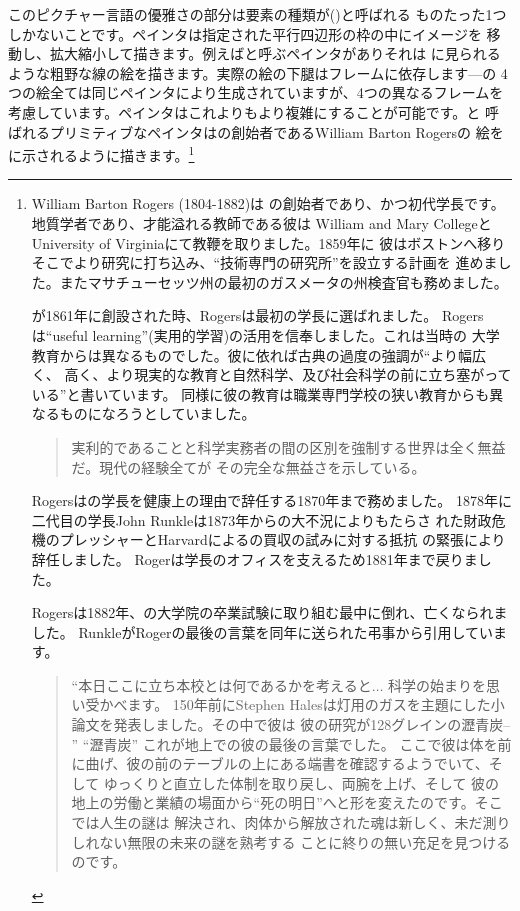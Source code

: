 \noindent
このピクチャー言語の優雅さの部分は要素の種類が()と呼ばれる
ものたった1つしかないことです。ペインタは指定された平行四辺形の枠の中にイメージを
移動し、拡大縮小して描きます。例えばと呼ぶペインタがありそれは
に見られるような粗野な線の絵を描きます。実際の絵の下腿はフレームに依存します---の
4つの絵全ては同じペインタにより生成されていますが、4つの異なるフレームを
考慮しています。ペインタはこれよりもより複雑にすることが可能です。と
呼ばれるプリミティブなペインタはの創始者であるWilliam Barton Rogersの
絵をに示されるように描きます。\footnote{
William Barton Rogers (1804-1882)は
の創始者であり、かつ初代学長です。地質学者であり、才能溢れる教師である彼は
William and Mary CollegeとUniversity of Virginiaにて教鞭を取りました。1859年に
彼はボストンへ移りそこでより研究に打ち込み、``技術専門の研究所''を設立する計画を
進めました。またマサチューセッツ州の最初のガスメータの州検査官も務めました。




が1861年に創設された時、Rogersは最初の学長に選ばれました。
Rogersは``useful learning''(実用的学習)の活用を信奉しました。これは当時の
大学教育からは異なるものでした。彼に依れば古典の過度の強調が``より幅広く、
高く、より現実的な教育と自然科学、及び社会科学の前に立ち塞がっている''と書いています。
同様に彼の教育は職業専門学校の狭い教育からも異なるものになろうとしていました。

\begin{quote}
実利的であることと科学実務者の間の区別を強制する世界は全く無益だ。現代の経験全てが
その完全な無益さを示している。
\end{quote}



Rogersはの学長を健康上の理由で辞任する1870年まで務めました。
1878年に二代目の学長John Runkleは1873年からの大不況によりもたらさ
れた財政危機のプレッシャーとHarvardによるの買収の試みに対する抵抗
の緊張により辞任しました。
Rogerは学長のオフィスを支えるため1881年まで戻りました。



Rogersは1882年、の大学院の卒業試験に取り組む最中に倒れ、亡くなられました。
RunkleがRogerの最後の言葉を同年に送られた弔事から引用しています。

\begin{quote}
``本日ここに立ち本校とは何であるかを考えると\( \dots \) 科学の始まりを思い受かべます。
150年前にStephen Halesは灯用のガスを主題にした小論文を発表しました。その中で彼は
彼の研究が128グレインの瀝青炭-- '' ``瀝青炭'' これが地上での彼の最後の言葉でした。
ここで彼は体を前に曲げ、彼の前のテーブルの上にある端書を確認するようでいて、そして
ゆっくりと直立した体制を取り戻し、両腕を上げ、そして
彼の地上の労働と業績の場面から``死の明日''へと形を変えたのです。そこでは人生の謎は
解決され、肉体から解放された魂は新しく、未だ測りしれない無限の未来の謎を熟考する
ことに終りの無い充足を見つけるのです。
\end{quote}

}
